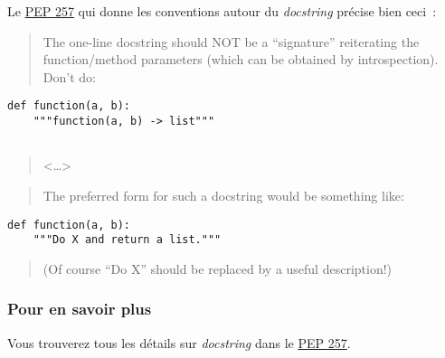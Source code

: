 Le \href{http://legacy.python.org/dev/peps/pep-0257/}{PEP 257} qui donne
les conventions autour du \emph{docstring} précise bien ceci~:

    \begin{quote}
The one-line docstring should NOT be a ``signature'' reiterating the
function/method parameters (which can be obtained by introspection).
Don't do:
\end{quote}

\begin{verbatim}
def function(a, b):
    """function(a, b) -> list"""
 
\end{verbatim}

\begin{quote}
\textless{}\ldots{}\textgreater{}
\end{quote}

\begin{quote}
The preferred form for such a docstring would be something like:
\end{quote}

\begin{verbatim}
def function(a, b):
    """Do X and return a list."""
\end{verbatim}

\begin{quote}
(Of course ``Do X'' should be replaced by a useful description!)
\end{quote}

    \hypertarget{pour-en-savoir-plus}{%
\subsubsection{Pour en savoir plus}\label{pour-en-savoir-plus}}

    Vous trouverez tous les détails sur \emph{docstring} dans le
\href{http://legacy.python.org/dev/peps/pep-0257/}{PEP 257}.